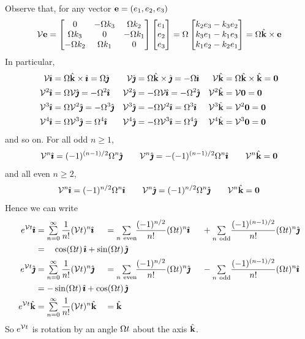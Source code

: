 \begin{eg}
Observe that, for any vector $\ve=(e_1,e_2,e_3)$
\begin{equation*}
\cV\ve=\left[\begin{matrix}0 & -\Om k_3 & \Om k_2\cr
                \Om k_3& 0 & -\Om k_1\cr
                -\Om k_2&  \Om k_1&0\end{matrix}\right]
\left[\begin{matrix}e_1\cr e_2\cr e_3\end{matrix}\right]
=\Om\left[\begin{matrix}k_2e_3-k_3e_2\cr k_3e_1-k_1e_3\cr k_1e_2-k_2e_1\end{matrix}\right]
=\Om\hk\times \ve
\end{equation*}
In particular,
\begin{align*}
\cV\hi&=\Om\hk\times \hi=\Om\hj &
\cV\hj&=\Om\hk\times \hj=-\Om\hi &
\cV\hk&=\Om\hk\times \hk=\vZero \\
\cV^2\hi&=\Om \cV\hj=-\Om^2\hi &
\cV^2\hj&=-\Om \cV\hi=-\Om^2\hj &
\cV^2\hk&=\cV\vZero=\vZero \\
\cV^3\hi&=\Om \cV^2\hj=-\Om^3\hj &
\cV^3\hj&=-\Om \cV^2\hi=\Om^3\hi &
\cV^3\hk&=\cV^2\vZero=\vZero \\
\cV^4\hi&=\Om \cV^3\hj=\Om^4\hi &
\cV^4\hj&=-\Om \cV^3\hi=\Om^4\hj &
\cV^4\hk&=\cV^3\vZero=\vZero
\end{align*}
and so on.
For all odd $n\ge 1$,
\begin{equation*}
\cV^n\hi=(-1)^{(n-1)/2}\Om^n\hj \qquad
\cV^n\hj=-(-1)^{(n-1)/2}\Om^n\hi \qquad
\cV^n\hk=\vZero
\end{equation*}
and all even $n\ge 2$,
\begin{equation*}
\cV^n\hi=(-1)^{n/2}\Om^n\hi \qquad
\cV^n\hj=(-1)^{n/2}\Om^n\hj \qquad
\cV^n\hk=\vZero
\end{equation*}
Hence we can write
\begin{alignat*}{3}
e^{\cV t}\hi
   &=\smsum_{n=0}^\infty \frac{1}{n!}(\cV t)^n\hi
   &&=\smsum_{n\ {\rm even}}\!\! \frac{(-1)^{n/2}}{n!}(\Om t)^n\hi
     &&\ +\smsum_{n\ {\rm odd}}\! \frac{(-1)^{(n-1)/2}}{n!}(\Om t)^n\hj \\
  &=\phantom{-}\cos(\Om t)\,\hi+\sin(\Om t)\,\hj\hidewidth\\
e^{\cV t}\hj
   &=\smsum_{n=0}^\infty \frac{1}{n!}(\cV t)^n\hj
   &&=\smsum_{n\ {\rm even}}\!\! \frac{(-1)^{n/2}}{n!}(\Om t)^n\hj
    &&\ -\smsum_{n\ {\rm odd}}\! \frac{(-1)^{(n-1)/2}}{n!}(\Om t)^n\hi \\
  &=-\sin(\Om t)\,\hi+\cos(\Om t)\,\hj\hidewidth\\
e^{\cV t}\hk
   &=\smsum_{n=0}^\infty \frac{1}{n!}(\cV t)^n\hk
   &&=\hk
\end{alignat*}
So $e^{\cV t}$ is rotation by an angle $\Om t$ about the axis $\hk$.

\end{eg}

